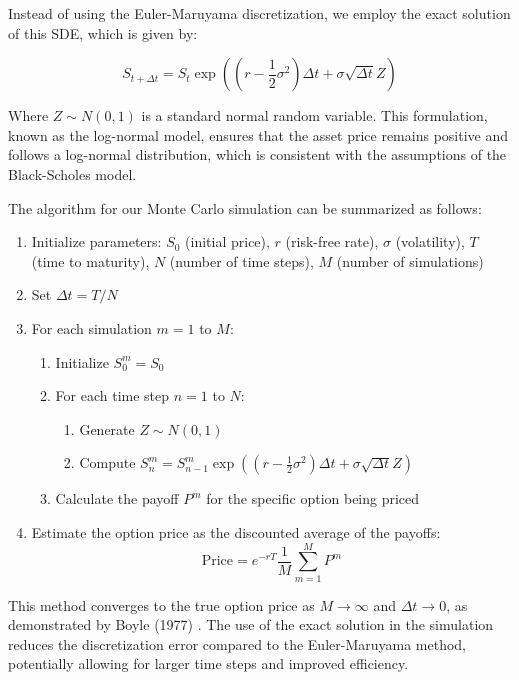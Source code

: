 \documentclass[12pt]{article}
\begin{document}
Instead of using the Euler-Maruyama discretization, we employ the exact solution of this SDE, which is given by:

\begin{equation}
    S_{t+\Delta t} = S_t \exp\left((r - \frac{1}{2}\sigma^2)\Delta t + \sigma \sqrt{\Delta t} Z\right)
\end{equation}

Where $Z \sim N(0,1)$ is a standard normal random variable. This formulation, known as the log-normal model, ensures that the asset price remains positive and follows a log-normal distribution, which is consistent with the assumptions of the Black-Scholes model.

The algorithm for our Monte Carlo simulation can be summarized as follows:

\begin{enumerate}
    \item Initialize parameters: $S_0$ (initial price), $r$ (risk-free rate), $\sigma$ (volatility), $T$ (time to maturity), $N$ (number of time steps), $M$ (number of simulations)
    \item Set $\Delta t = T/N$
    \item For each simulation $m = 1$ to $M$:
        \begin{enumerate}
            \item Initialize $S_0^m = S_0$
            \item For each time step $n = 1$ to $N$:
                \begin{enumerate}
                    \item Generate $Z \sim N(0,1)$
                    \item Compute $S_n^m = S_{n-1}^m \exp\left((r - \frac{1}{2}\sigma^2)\Delta t + \sigma \sqrt{\Delta t} Z\right)$
                \end{enumerate}
            \item Calculate the payoff $P^m$ for the specific option being priced
        \end{enumerate}
    \item Estimate the option price as the discounted average of the payoffs:
        \begin{equation}
            \text{Price} = e^{-rT} \frac{1}{M} \sum_{m=1}^M P^m
        \end{equation}
\end{enumerate}

This method converges to the true option price as $M \to \infty$ and $\Delta t \to 0$, as demonstrated by Boyle (1977) \cite{Boyle1977}. The use of the exact solution in the simulation reduces the discretization error compared to the Euler-Maruyama method, potentially allowing for larger time steps and improved efficiency.
\end{document}
